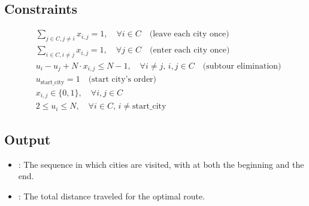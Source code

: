 \documentclass{article}
\begin{document}
\subsection*{Constraints}
\begin{align}
& \sum_{j \in C, j \neq i} x_{i,j} = 1, \quad \forall i \in C \quad \text{(leave each city once)} \\
& \sum_{i \in C, i \neq j} x_{i,j} = 1, \quad \forall j \in C \quad \text{(enter each city once)} \\
& u_{i} - u_{j} + N \cdot x_{i,j} \leq N - 1, \quad \forall i \neq j, \, i, j \in C \quad \text{(subtour elimination)} \\
& u_{\text{start\_city}} = 1 \quad \text{(start city's order)} \\
& x_{i,j} \in \{0,1\}, \quad \forall i, j \in C \\
& 2 \leq u_i \leq N, \quad \forall i \in C, \, i \neq \text{start\_city}
\end{align}

\subsection*{Output}
\begin{itemize}
    \item {}: The sequence in which cities are visited, with  at both the beginning and the end.
    \item {}: The total distance traveled for the optimal route.
\end{itemize}
\end{document}
